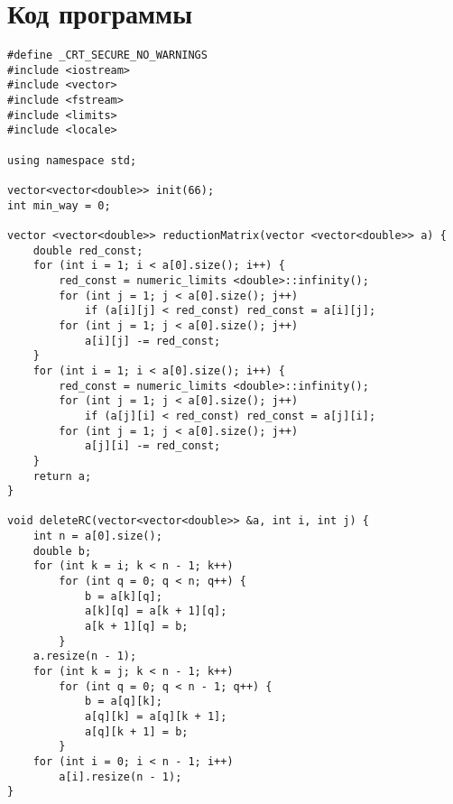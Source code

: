 \documentclass[a4paper, 12pt] {article}
\begin{document}
\newpage

\section{Код программы}

\begin{verbatim}
#define _CRT_SECURE_NO_WARNINGS
#include <iostream>
#include <vector>
#include <fstream>
#include <limits>
#include <locale>

using namespace std;

vector<vector<double>> init(66);
int min_way = 0;

vector <vector<double>> reductionMatrix(vector <vector<double>> a) {
    double red_const;
    for (int i = 1; i < a[0].size(); i++) {
        red_const = numeric_limits <double>::infinity();
        for (int j = 1; j < a[0].size(); j++)
            if (a[i][j] < red_const) red_const = a[i][j];
        for (int j = 1; j < a[0].size(); j++)
            a[i][j] -= red_const;
    }
    for (int i = 1; i < a[0].size(); i++) {
        red_const = numeric_limits <double>::infinity();
        for (int j = 1; j < a[0].size(); j++)
            if (a[j][i] < red_const) red_const = a[j][i];
        for (int j = 1; j < a[0].size(); j++)
            a[j][i] -= red_const;
    }
    return a;
}

void deleteRC(vector<vector<double>> &a, int i, int j) {
    int n = a[0].size();
    double b;
    for (int k = i; k < n - 1; k++)
        for (int q = 0; q < n; q++) {
            b = a[k][q];
            a[k][q] = a[k + 1][q];
            a[k + 1][q] = b;
        }
    a.resize(n - 1);
    for (int k = j; k < n - 1; k++)
        for (int q = 0; q < n - 1; q++) {
            b = a[q][k];
            a[q][k] = a[q][k + 1];
            a[q][k + 1] = b;
        }
    for (int i = 0; i < n - 1; i++)
        a[i].resize(n - 1);
}


\end{verbatim}
\end{document}
